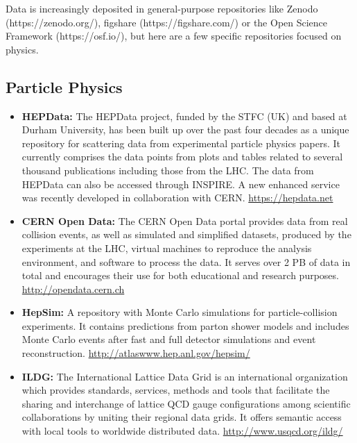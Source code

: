 Data is increasingly deposited in general-purpose repositories like
Zenodo (https://zenodo.org/), figshare (https://figshare.com/) or the
Open Science Framework (https://osf.io/), but here are a few specific
repositories focused on physics.
\subsection{Particle Physics}\label{databases:subsec:particlephysrep}

\begin{itemize}
\item
  \textbf{HEPData:} The HEPData project, funded by the STFC (UK) and
  based at Durham University, has been built up over the past four
  decades as a unique repository for scattering data from experimental
  particle physics papers. It currently comprises the data points from
  plots and tables related to several thousand publications including
  those from the LHC. The data from HEPData can also be accessed through
  INSPIRE. A new enhanced service was recently developed in
  collaboration with CERN. \url{https://hepdata.net}
\item
  \textbf{CERN Open Data:} The CERN Open Data portal provides data from
  real collision events, as well as simulated and simplified datasets,
  produced by the experiments at the LHC, virtual machines to reproduce
  the analysis environment, and software to process the data. It serves
  over 2 PB of data in total and encourages their use for both
  educational and research purposes. \url{http://opendata.cern.ch}
\item
  \textbf{HepSim:} A repository with Monte Carlo simulations for
  particle-collision experiments. It contains predictions from parton
  shower models and includes Monte Carlo events after fast and full
  detector simulations and event reconstruction.
  \url{http://atlaswww.hep.anl.gov/hepsim/}
\item
  \textbf{ILDG:} The International Lattice Data Grid is an international
  organization which provides standards, services, methods and tools
  that facilitate the sharing and interchange of lattice QCD gauge
  configurations among scientific collaborations by uniting their
  regional data grids. It offers semantic access with local tools to
  worldwide distributed data. \url{http://www.usqcd.org/ildg/}

\end{itemize}
